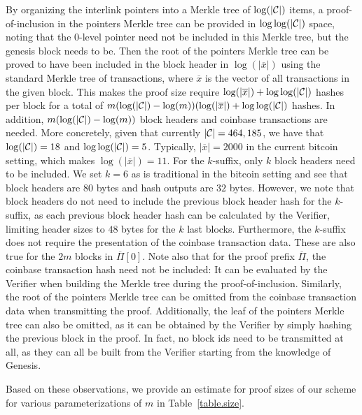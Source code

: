By organizing the interlink pointers into a Merkle tree of $\log(|\mathcal{C}|)$
items, a proof-of-inclusion in the pointers Merkle tree can be provided in
$\log \log(|\mathcal{C}|)$ space, noting that the $0$-level pointer need not be
included in this Merkle tree, but the genesis block needs to be. Then the root
of the pointers Merkle tree can be proved to have been included in the block
header in $\log(|\overline x|)$ using the standard Merkle tree of transactions,
where $\overline x$ is the vector of all transactions in the given block. This
makes the proof size require $\log(|\overline x|) + \log\log(|\mathcal{C}|)$ hashes per
block for a total of $m (\log(|\mathcal{C}|) - \log(m))(\log(|\overline x|) +
\log\log(|\mathcal{C}|)$ hashes. In addition, $m (\log(|\mathcal{C}|) - \log(m))$ block headers
and coinbase transactions are needed. More concretely, given that currently
$|\mathcal{C}| = 464,185$, we have that $\log(|\mathcal{C}|) = 18$ and $\log\log(|\mathcal{C}|) =
5$.  Typically, $|\overline x| = 2000$ in the current bitcoin setting, which
makes $\log(|\overline x|) = 11$. For the $k$-suffix, only $k$ block headers need
to be included. We set $k = 6$ as is traditional in the bitcoin setting and see
that block headers are $80$ bytes and hash outputs are $32$ bytes. However, we
note that block headers do not need to include the previous block header hash
for the $k$-suffix, as each previous block header hash can be calculated by the
Verifier, limiting header sizes to $48$ bytes for the $k$ last blocks.
Furthermore, the $k$-suffix does not require the presentation of the coinbase
transaction data. These are also true for the $2m$ blocks in $\overline \Pi[0]$.
Note also that for the proof prefix $\overline \Pi$, the coinbase transaction
hash need not be included: It can be evaluated by the Verifier when building
the Merkle tree during the proof-of-inclusion. Similarly, the root of the
pointers Merkle tree can be omitted from the coinbase transaction data when
transmitting the proof. Additionally, the leaf of the pointers Merkle tree can
also be omitted, as it can be obtained by the Verifier by simply hashing the
previous block in the proof. In fact, no block ids need to be transmitted at
all, as they can all be built from the Verifier starting from the knowledge of
Genesis.

Based on these observations, we provide an estimate for proof sizes of our
scheme for various parameterizations of $m$ in Table~\ref{table.size}.

